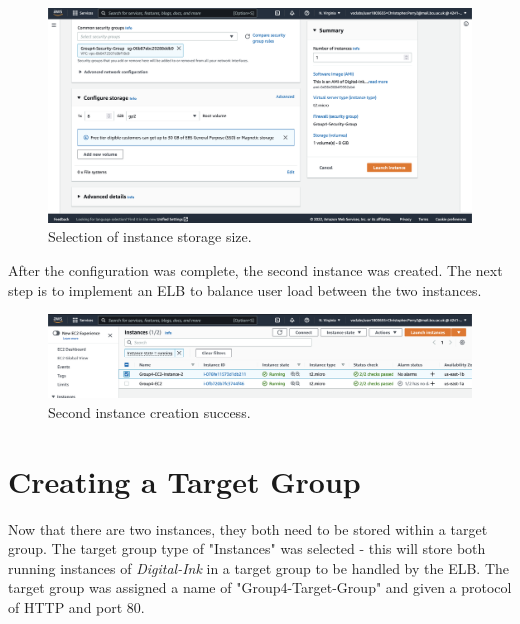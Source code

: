 \begin{figure}[!htbp]
	\centering
	\includegraphics[width=\textwidth]{resources/elb/elb-instance-2-storage-config}
	\caption{Selection of instance storage size.}
	\label{fig:elb-instance-2-storage}
\end{figure}

After the configuration was complete, the second instance was created.
The next step is to implement an ELB to balance user load between the two instances.

\begin{figure}[!htbp]
	  \centering
	  \includegraphics[width=\textwidth]{resources/elb/elb-instance-2-created}
	  \caption{Second instance creation success.}
	  \label{fig:elb-instance-2-create}
\end{figure}

\clearpage
\section{Creating a Target Group}\label{sec:creating-a-target-group}

Now that there are two instances, they both need to be stored within a target group.
The target group type of "Instances" was selected - this will store both running instances of \textit{Digital-Ink} in a
target group to be handled by the ELB\@.
The target group was assigned a name of "Group4-Target-Group" and given a protocol of HTTP and port 80.

